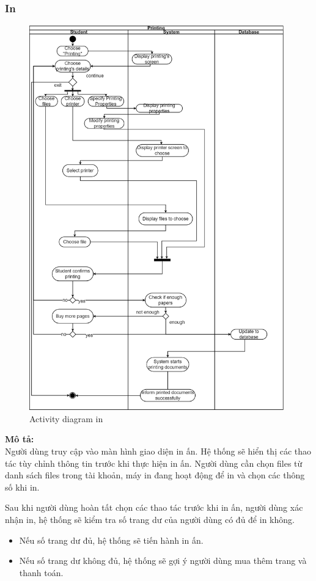 \documentclass[a4paper]{article}
\begin{document}
\subsubsection{In}
\begin{figure}[h!]
\begin{center}
\includegraphics[width=11cm]{picture/Activiti_diagram_Print.drawio.png}
\caption{Activity diagram in}
\end{center}
\end{figure}
\newpage
\noindent \textbf{Mô tả:}\\
Người dùng truy cập vào màn hình giao diện in ấn. Hệ thống sẽ hiển thị các thao tác tùy chỉnh thông tin trước khi thực hiện in ấn. Người dùng cần chọn files từ danh sách files trong tài khoản, máy in đang hoạt động để in và chọn các thông số khi in. 

\noindent Sau khi người dùng hoàn tất chọn các thao tác trước khi in ấn, người dùng xác nhận in, hệ thống sẽ kiểm tra số trang dư của người dùng có đủ để in không.
\begin{itemize}
    \item Nếu số trang dư đủ, hệ thống sẽ tiến hành in ấn.

    \item Nếu số trang dư không đủ, hệ thống sẽ gợi ý người dùng mua thêm trang và thanh toán.
\end{itemize}
\end{document}
